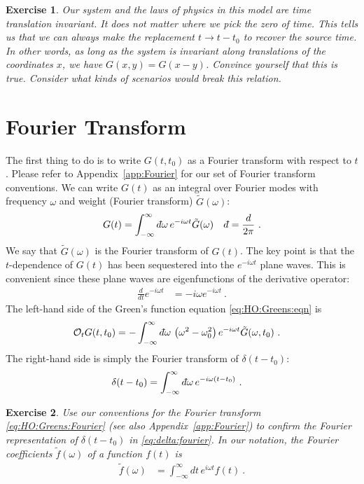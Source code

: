 \documentclass[
  11pt,
	colorful,
	raggedright,
]{tufte-style-thesis-flip}
\newtheorem{exercise}{Exercise}[section]
\renewcommand{\dbar}{d\hspace*{-0.08em}\bar{}\hspace*{0.1em}}
\begin{document}
\begin{exercise}
Our system and the laws of physics in this model are time translation invariant. It does not matter where we pick the zero of time. This tells us that we can always make the replacement $t\to t-t_0$ to recover the source time. In other words, as long as the system is invariant along translations of the coordinates $x$, we have $G(x,y) = G(x-y)$. Convince yourself that this is true. Consider what kinds of scenarios would break this relation.
\end{exercise}

\section{Fourier Transform}

The first thing to do is to write $G(t,t_0)$ as a Fourier transform with respect to $t$. Please refer to Appendix~\ref{app:Fourier} for our set of Fourier transform conventions. We can write $G(t)$ as an integral over Fourier modes with frequency $\omega$ and weight (Fourier transform) $\tilde G(\omega)$:
\begin{align}
  G(t) &= \int_{-\infty}^\infty\dbar \omega \, e^{-i\omega t} \tilde G(\omega) 
  &
  \dbar = \frac{d}{2\pi}
  \ .
  \label{eq:HO:Greens:Fourier}
\end{align}
We say that $\tilde G(\omega)$ is the Fourier transform of $G(t)$. The key point is that the $t$-dependence of $G(t)$ has been sequestered into the $e^{-i\omega t}$ plane waves. This is convenient since these plane waves are eigenfunctions of the derivative operator:
\begin{align}
  \frac{d}{dt} e^{-i\omega t} &= -i\omega e^{-i\omega t} \ .
\end{align}
The left-hand side of the Green's function equation \eqref{eq:HO:Greens:eqn} is
\begin{align}
  \mathcal O_t G(t,t_0) 
  &= 
  -
  \int_{-\infty}^\infty \dbar \omega \, 
  \left(\omega^2-\omega_0^2\right) e^{-i\omega t} \tilde G(\omega,t_0) \ .
\end{align}
The right-hand side is simply the Fourier transform of $\delta(t-t_0)$:
\begin{align}
  \delta(t-t_0)
  &=
  \int_{-\infty}^\infty \dbar \omega \, e^{-i\omega (t-t_0)} \ .
  \label{eq:delta:fourier}
\end{align}
\begin{exercise}
Use our conventions for the Fourier transform \eqref{eq:HO:Greens:Fourier} (see also Appendix~\ref{app:Fourier}) to confirm the Fourier representation of $\delta(t-t_0)$ in \eqref{eq:delta:fourier}. In our notation, the Fourier coefficients $\tilde f(\omega)$ of a function $f(t)$ is
\begin{align}
  \tilde f(\omega) &= 
  \int_{-\infty}^\infty d t\, e^{i\omega t} f(t) \ .
\end{align}
\end{exercise}
\end{document}
